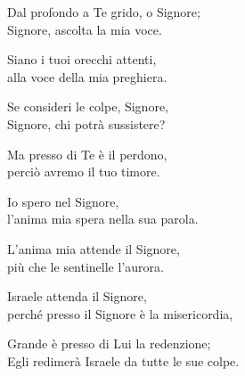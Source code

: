 

\spazio

\strofa Dal profondo a Te grido, o Signore;\\
Signore, ascolta la mia voce.

\spazio

\strofa Siano i tuoi orecchi attenti,\\
alla voce della mia preghiera.

\spazio

\strofa Se consideri le colpe, Signore,\\
Signore, chi potrà sussistere?

\spazio

\strofa Ma presso di Te è il perdono,\\
perciò avremo il tuo timore.

\spazio

\strofa Io spero nel Signore,\\
l'anima mia spera nella sua parola.

\spazio

\strofa L'anima mia attende il Signore,\\
più che le sentinelle l'aurora.

\spazio

\strofa Israele attenda il Signore,\\
perché presso il Signore è la misericordia,

\spazio

\strofa Grande è presso di Lui la redenzione;\\
Egli redimerà Israele da tutte le sue colpe.